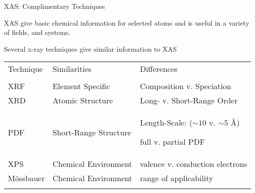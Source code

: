 \begin{slide}{XAS:  Complimentary Techniques}
    \vmm

\begin{cenpage}{99mm}

    {\begin{postitbox}{80mm} XAS give basic chemical information for
        selected atoms and is useful in a variety of fields, and systems.
      \end{postitbox}}

\vmm \vmm

    Several x-ray techniques give similar information to XAS
    \vmm

    \begin{tabular}{lll}
      Technique   &  Similarities  &  Differences\\
      \noalign{\hrule} \\
      XRF &  Element Specific & Composition v. Speciation\\
      \noalign{\medskip}
      XRD &  Atomic Structure  & Long- v. Short-Range
      Order \\ \noalign{\medskip}
      PDF &  Short-Range Structure &  \begin{minipage}{45mm}
        Length-Scale: ($\sim 10$ v. $\sim 5$ \AA) \par
        full v. partial PDF
        \end{minipage}
        \\ \noalign{\medskip}
      XPS &  Chemical Environment  & valence v. conduction electrons \\
      \noalign{\medskip}
      M\"ossbauer &  Chemical Environment & range  of applicability\\
      \noalign{\hrule} \\
    \end{tabular}

\vmm

\end{cenpage}
\end{slide}

